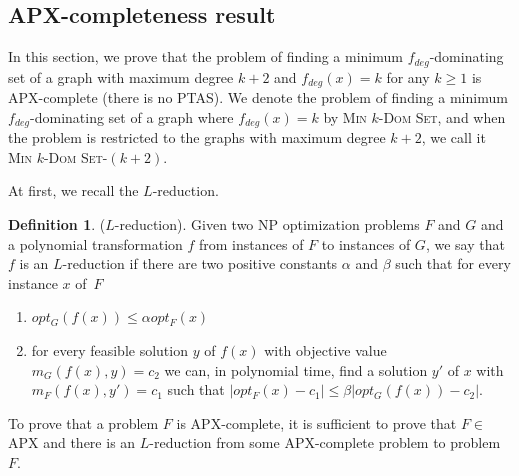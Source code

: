 \documentclass[a0,portrait]{a0poster}
\theoremstyle{definition}
\newtheorem{definition}{Definition}[section]
\theoremstyle{plain}
\theoremstyle{definition}
\begin{document}
\begin{multicols}{2}
\section{APX-completeness result}
In this section, we prove that  the problem of finding a minimum  $f_{deg}$-dominating set of a graph with maximum degree  $k+2$ and  $f_{deg}(x)=k$ for any $k\geq 1$ is APX-complete (there is no PTAS). We denote  the problem of finding a minimum $f_{deg}$-dominating set of a graph where  $f_{deg}(x)=k$ by {\textsc{ Min}} $k$-{\textsc {Dom Set}}, and when the problem is restricted to the graphs with maximum degree $k+2$, we call it {\textsc{ Min}} $k$-{\textsc {Dom Set}}-$(k+2)$. 

At first{,} we recall the $L$-reduction. 
\begin{definition}
\label{defdef}
($L$-reduction)\cite{ausiello}. Given two NP optimization problems $F$ and $G$ and a polynomial transformation $f$ from instances of $F$ to instances of $G$, we say
that $f$ is an $L$-reduction if there are {two} positive constants
$\alpha$ and $\beta$ such that for every instance $x$ of~$F$
\begin{enumerate}
\item $opt_G(f(x))\leq \alpha opt_F (x)$
\item for every feasible solution $y$ of $f(x)$ with objective value $m_G(f (x),y) = c_2$ we can, in polynomial time, find a solution $y'$ of $x$ with $m_F (f (x),y')=c_1$ such that $|opt_F (x)-c_1|\leq \beta|opt_G(f (x))-c_2|$.
\end{enumerate}
\end{definition}
{To prove that a problem $F$ is APX-complete, it is {sufficient} to prove that}  $F\in$APX and there is an $L$-reduction  from some APX-complete problem to  problem $F$.


\end{multicols}
\end{document}
